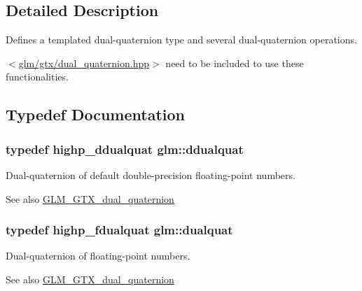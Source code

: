 \subsection{Detailed Description}
Defines a templated dual-\/quaternion type and several dual-\/quaternion operations. 

$<$\hyperlink{dual__quaternion_8hpp}{glm/gtx/dual\+\_\+quaternion.\+hpp}$>$ need to be included to use these functionalities. 

\subsection{Typedef Documentation}
\subsubsection[{\texorpdfstring{ddualquat}{ddualquat}}]{\setlength{\rightskip}{0pt plus 5cm}typedef highp\+\_\+ddualquat {\bf glm\+::ddualquat}}\hypertarget{group__gtc__dual__quaternion_ga373431ffdd82d5c03c258217a9e1f1a6}{}\label{group__gtc__dual__quaternion_ga373431ffdd82d5c03c258217a9e1f1a6}
Dual-\/quaternion of default double-\/precision floating-\/point numbers.

\begin{DoxySeeAlso}{See also}
\hyperlink{group__gtc__dual__quaternion}{G\+L\+M\+\_\+\+G\+T\+X\+\_\+dual\+\_\+quaternion} 
\end{DoxySeeAlso}
\subsubsection[{\texorpdfstring{dualquat}{dualquat}}]{\setlength{\rightskip}{0pt plus 5cm}typedef highp\+\_\+fdualquat {\bf glm\+::dualquat}}\hypertarget{group__gtc__dual__quaternion_ga2f6227b5f9dc08a2e7682065a84b3aa9}{}\label{group__gtc__dual__quaternion_ga2f6227b5f9dc08a2e7682065a84b3aa9}
Dual-\/quaternion of floating-\/point numbers.

\begin{DoxySeeAlso}{See also}
\hyperlink{group__gtc__dual__quaternion}{G\+L\+M\+\_\+\+G\+T\+X\+\_\+dual\+\_\+quaternion} 
\end{DoxySeeAlso}
